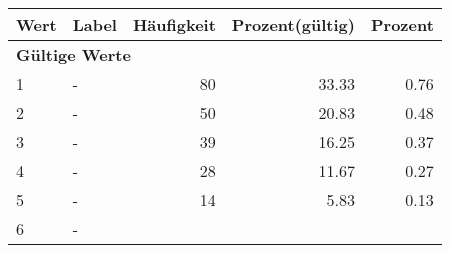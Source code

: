     \begin{longtable}{lXrrr}
     \toprule
     \textbf{Wert} & \textbf{Label} & \textbf{Häufigkeit} & \textbf{Prozent(gültig)} & \textbf{Prozent} \\
     \endhead
     \midrule
     \multicolumn{5}{l}{\textbf{Gültige Werte}}\\

     1 &
     \multicolumn{1}{X}{ -  } &


       \num{80} &
       \num[round-mode=places,round-precision=2]{33,33} &
         \num[round-mode=places,round-precision=2]{0,76} \\

     2 &
     \multicolumn{1}{X}{ -  } &


       \num{50} &
       \num[round-mode=places,round-precision=2]{20,83} &
         \num[round-mode=places,round-precision=2]{0,48} \\

     3 &
     \multicolumn{1}{X}{ -  } &


       \num{39} &
       \num[round-mode=places,round-precision=2]{16,25} &
         \num[round-mode=places,round-precision=2]{0,37} \\

     4 &
     \multicolumn{1}{X}{ -  } &


       \num{28} &
       \num[round-mode=places,round-precision=2]{11,67} &
         \num[round-mode=places,round-precision=2]{0,27} \\

     5 &
     \multicolumn{1}{X}{ -  } &


       \num{14} &
       \num[round-mode=places,round-precision=2]{5,83} &
         \num[round-mode=places,round-precision=2]{0,13} \\

     6 &
     \multicolumn{1}{X}{ -  } &



\end{longtable}
